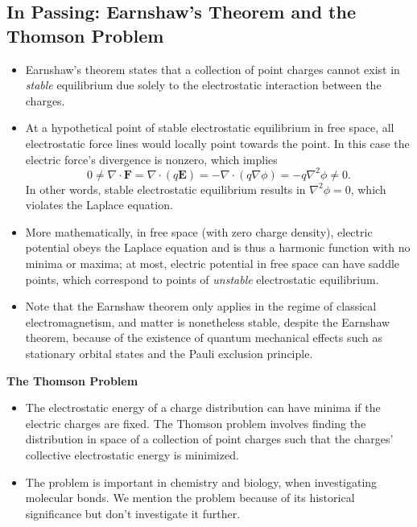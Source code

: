 \documentclass[11pt, a4paper]{article}
\renewcommand{\vec}[1]{\bm{#1}} %
\newcommand{\E}{\vec{E}} %
\renewcommand{\div}{\nabla \cdot}
\renewcommand{\grad}{\nabla}
\renewcommand{\laplacian}{\nabla^{2}}
\begin{document}
\subsection{In Passing: Earnshaw's Theorem and the Thomson Problem}
\begin{itemize}
	\item Earnshaw's theorem states that a collection of point charges cannot exist in \textit{stable} equilibrium due solely to the electrostatic interaction between the charges. 
	
	\item At a hypothetical point of stable electrostatic equilibrium in free space, all electrostatic force lines would locally point towards the point. In this case the electric force's divergence is nonzero, which implies
	\begin{equation*}
		0 \neq \div \vec{F} = \div (q \E) = - \div (q \grad \phi) = - q \laplacian \phi \neq 0.
	\end{equation*}
	In other words, stable electrostatic equilibrium results in $ \laplacian \phi = 0 $, which violates the Laplace equation.
	
	\item More mathematically, in free space (with zero charge density), electric potential obeys the Laplace equation and is thus a harmonic function with no minima or maxima; at most, electric potential in free space can have saddle points, which correspond to points of \textit{unstable} electrostatic equilibrium. 
	
	\item Note that the Earnshaw theorem only applies in the regime of classical electromagnetism, and matter is nonetheless stable, despite the Earnshaw theorem, because of the existence of quantum mechanical effects such as stationary orbital states and the Pauli exclusion principle.
\end{itemize}

\textbf{The Thomson Problem}
\begin{itemize}
	\item The electrostatic energy of a charge distribution can have minima if the electric charges are fixed. The Thomson problem involves finding the distribution in space of a collection of point charges such that the charges' collective electrostatic energy is minimized.
	
	\item The problem is important in chemistry and biology, when investigating molecular bonds. We mention the problem because of its historical significance but don't investigate it further.
\end{itemize}
\end{document}

